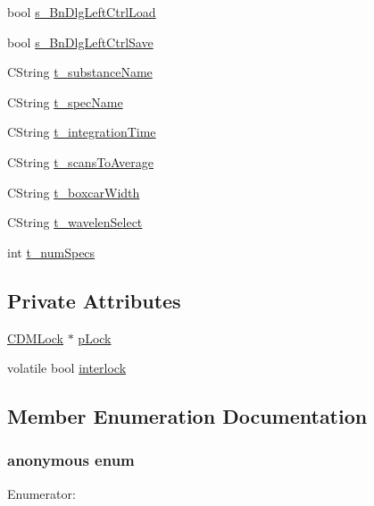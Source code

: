\begin{DoxyCompactItemize}
\item 
bool \hyperlink{classCDlgBarControl_a474d47481b1bab17a1a65534a13a2e2b}{s\_\-BnDlgLeftCtrlLoad}
\item 
bool \hyperlink{classCDlgBarControl_a6bab1a18b14ef2c989d2336b76b4e3bb}{s\_\-BnDlgLeftCtrlSave}
\item 
CString \hyperlink{classCDlgBarControl_a2bcba70acd6f14afe83895d7691205a8}{t\_\-substanceName}
\item 
CString \hyperlink{classCDlgBarControl_a9e37906ad82cc1feac6c1bf4e89913ed}{t\_\-specName}
\item 
CString \hyperlink{classCDlgBarControl_a6628dd4e1a9ce4e87f8199944769010e}{t\_\-integrationTime}
\item 
CString \hyperlink{classCDlgBarControl_a2fa3398d7e2a24fd7d430a49651e59ba}{t\_\-scansToAverage}
\item 
CString \hyperlink{classCDlgBarControl_ab26d53edccbebd861805d68f93d81399}{t\_\-boxcarWidth}
\item 
CString \hyperlink{classCDlgBarControl_ab8367952cb5f8d8502f50bfab868d79a}{t\_\-wavelenSelect}
\item 
int \hyperlink{classCDlgBarControl_a3a07b30cb91e4afa29c7b56eae3b13cf}{t\_\-numSpecs}
\end{DoxyCompactItemize}
\subsection*{Private Attributes}
\begin{DoxyCompactItemize}
\item 
\hyperlink{classCDMLock}{CDMLock} $\ast$ \hyperlink{classCDlgBarControl_a2e0a0fd0511962da29bdcc398fe5b618}{pLock}
\item 
volatile bool \hyperlink{classCDlgBarControl_aab6af099f059a0b5fefa34626eb970ee}{interlock}
\end{DoxyCompactItemize}


\subsection{Member Enumeration Documentation}
\hypertarget{classCDlgBarControl_a27da53850b6ff0310dfc9dfb70688df0}{
\subsubsection[{"@4}]{\setlength{\rightskip}{0pt plus 5cm}anonymous enum}}
\label{classCDlgBarControl_a27da53850b6ff0310dfc9dfb70688df0}
\begin{Desc}
\item[Enumerator: ]\par
\begin{description}
\item[{\em 
\hypertarget{classCDlgBarControl_a27da53850b6ff0310dfc9dfb70688df0a77fbc02aac0dbba80d96b0777acb9994}{
IDD}
\label{classCDlgBarControl_a27da53850b6ff0310dfc9dfb70688df0a77fbc02aac0dbba80d96b0777acb9994}
}]\end{description}
\end{Desc}

